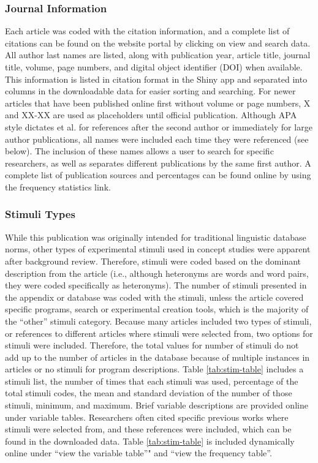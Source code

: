 \documentclass[english,man]{apa6}
\theoremstyle{definition}
\theoremstyle{definition}
\theoremstyle{definition}
\theoremstyle{remark}
\begin{document}
\subsubsection{Journal Information}\label{journal-information}

Each article was coded with the citation information, and a complete
list of citations can be found on the website portal by clicking on view
and search data. All author last names are listed, along with
publication year, article title, journal title, volume, page numbers,
and digital object identifier (DOI) when available. This information is
listed in citation format in the Shiny app and separated into columns in
the downloadable data for easier sorting and searching. For newer
articles that have been published online first without volume or page
numbers, X and XX-XX are used as placeholders until official
publication. Although APA style dictates et al. for references after the
second author or immediately for large author publications, all names
were included each time they were referenced (see below). The inclusion
of these names allows a user to search for specific researchers, as well
as separates different publications by the same first author. A complete
list of publication sources and percentages can be found online by using
the frequency statistics link.

\subsubsection{Stimuli Types}\label{stimuli-types}

While this publication was originally intended for traditional
linguistic database norms, other types of experimental stimuli used in
concept studies were apparent after background review. Therefore,
stimuli were coded based on the dominant description from the article
(i.e., although heteronyms are words and word pairs, they were coded
specifically as heteronyms). The number of stimuli presented in the
appendix or database was coded with the stimuli, unless the article
covered specific programs, search or experimental creation tools, which
is the majority of the \enquote{other} stimuli category. Because many
articles included two types of stimuli, or references to different
articles where stimuli were selected from, two options for stimuli were
included. Therefore, the total values for number of stimuli do not add
up to the number of articles in the database because of multiple
instances in articles or no stimuli for program descriptions. Table
\ref{tab:stim-table} includes a stimuli list, the number of times that
each stimuli was used, percentage of the total stimuli codes, the mean
and standard deviation of the number of those stimuli, minimum, and
maximum. Brief variable descriptions are provided online under variable
tables. Researchers often cited specific previous works where stimuli
were selected from, and these references were included, which can be
found in the downloaded data. Table \ref{tab:stim-table} is included
dynamically online under \enquote{view the variable table}" and
\enquote{view the frequency table}.
\end{document}
